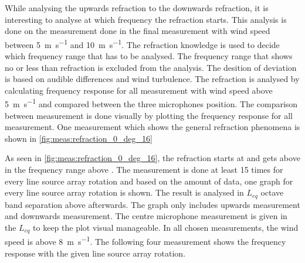 


While analysing the upwards refraction to the downwards refraction, it is interesting to analyse at which frequency the refraction starts. This analysis is done on the measurement done in the final measurement with wind speed between \SI{5}{\meter\per\second} and \SI{10}{\meter\per\second}. The refraction knowledge is used to decide which frequency range that has to be analysed. The frequency range that shows no or less than  refraction is excluded from the analysis. The desition of  deviation is based on audible differences and wind turbulence. The refraction is analysed by calculating frequency response for all measurement with wind speed above \SI{5}{\meter\per\second} and compared between the three microphones position. The comparison between measurement is done visually by plotting the frequency response for all measurement. One measurement which shows the general refraction phenomena is shown in \autoref{fig:meas:refraction_0_deg_16}




As seen in \autoref{fig:meas:refraction_0_deg_16}, the refraction starts at  and gets above  in the frequency range above . The measurement is done at least 15 times for every line source array rotation and based on the amount of data, one graph for every line source array rotation is shown. The result is analysed in $L_{eq}$ octave band separation above  afterwards. The graph only includes upwards measurement and downwards measurement. The centre microphone measurement is given in the $L_{eq}$  to keep the plot visual manageable. In all chosen measurements, the wind speed is above \SI{8}{\meter\per\second}. The following four measurement shows the frequency response with the given line source array rotation.


